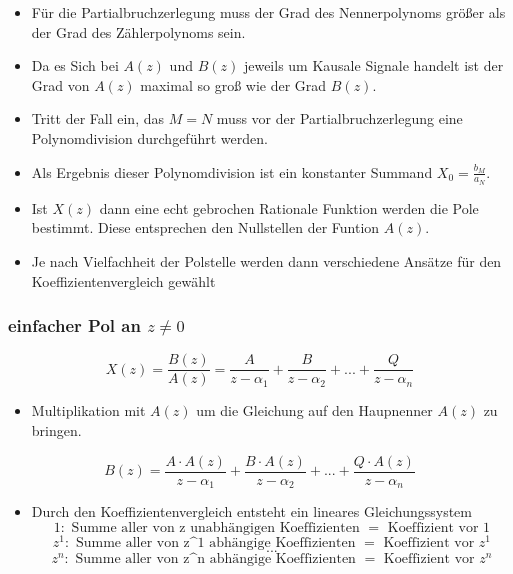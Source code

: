 \documentclass[11pt]{article}
\providecommand{\tightlist}{%
      \setlength{\itemsep}{0pt}\setlength{\parskip}{0pt}}
\begin{document}
    \begin{itemize}
\item
  Für die Partialbruchzerlegung muss der Grad des Nennerpolynoms größer
  als der Grad des Zählerpolynoms sein.
\item
  Da es Sich bei \(A(z)\) und \(B(z)\) jeweils um Kausale Signale
  handelt ist der Grad von \(A(z)\) maximal so groß wie der Grad
  \(B(z)\).
\item
  Tritt der Fall ein, das \(M = N\) muss vor der Partialbruchzerlegung
  eine Polynomdivision durchgeführt werden.
\item
  Als Ergebnis dieser Polynomdivision ist ein konstanter Summand
  \(X_0 = \frac{b_M}{a_N}\).
\item
  Ist \(X(z)\) dann eine echt gebrochen Rationale Funktion werden die
  Pole bestimmt. Diese entsprechen den Nullstellen der Funtion \(A(z)\).
\item
  Je nach Vielfachheit der Polstelle werden dann verschiedene Ansätze
  für den Koeffizientenvergleich gewählt
\end{itemize}

    \subsubsection{\texorpdfstring{einfacher Pol an
\(z \neq 0\)}{einfacher Pol an z \textbackslash{}neq 0}}\label{einfacher-pol-an-z-neq-0}

\[ X(z) = \frac{B(z)}{A(z)} = \frac{A}{z-\alpha_1} + \frac{B}{z-\alpha_2} + ... + \frac{Q}{z-\alpha_n}\]

    \begin{itemize}
\tightlist
\item
  Multiplikation mit \(A(z)\) um die Gleichung auf den Haupnenner
  \(A(z)\) zu bringen.
\end{itemize}

\[ B(z) = \frac{A\cdot A(z)}{z-\alpha_1} + \frac{B\cdot A(z)}{z-\alpha_2} + ... + \frac{Q\cdot A(z)}{z-\alpha_n}\]

    \begin{itemize}
\tightlist
\item
  Durch den Koeffizientenvergleich entsteht ein lineares
  Gleichungssystem \[
  1   : \textrm{ Summe aller von z unabhängigen Koeffizienten } = \textrm{ Koeffizient vor 1}
  \] \[
  z^1 : \textrm{ Summe aller von z^1 abhängige Koeffizienten }  = \textrm{ Koeffizient vor } z^1
  \] \[
  ...
  \] \[
  z^n : \textrm{ Summe aller von z^n abhängige Koeffizienten }  = \textrm{ Koeffizient vor } z^n
  \]
\end{itemize}
\end{document}
